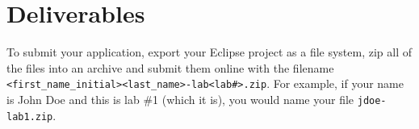 \section{Deliverables}

To submit your application, export your Eclipse project as a file system, zip all of the files into an archive and submit them online with the filename {\tt <first\_name\_initial><last\_name>-lab<lab\#>.zip}.  For example, if your name is John Doe and this is lab \#1 (which it is), you would name your file {\tt jdoe-lab1.zip}.